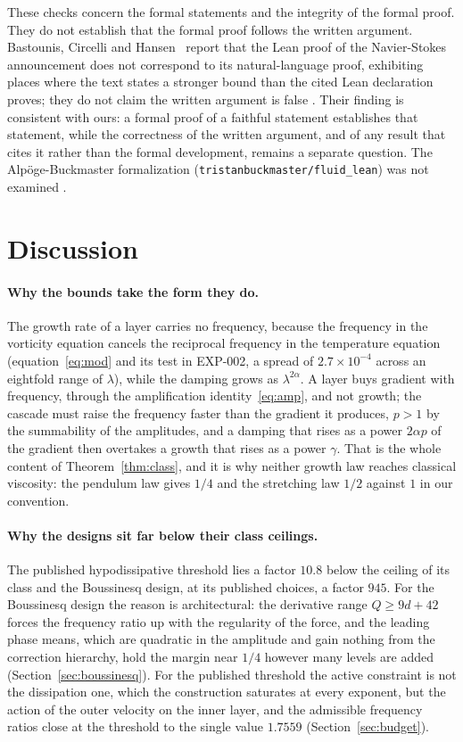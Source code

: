 \documentclass[11pt]{article}
\theoremstyle{remark}
\newcommand{\ev}[1]{\hspace{0.2em}{\small\textsf{[#1]}}}
\newcommand{\fp}[1]{\nolinkurl{#1}}
\begin{document}
These checks concern the formal statements and the integrity of the formal proof. They do not establish
that the formal proof follows the written argument. Bastounis, Circelli and Hansen~\cite{bch} report
that the Lean proof of the Navier-Stokes announcement does not correspond to its natural-language proof,
exhibiting places where the text states a stronger bound than the cited Lean declaration proves; they do
not claim the written argument is false \ev{V}. Their finding is consistent with ours: a formal proof of a
faithful statement establishes that statement, while the correctness of the written argument, and of
any result that cites it rather than the formal development, remains a separate question. The
Alp\"oge-Buckmaster formalization (\fp{tristanbuckmaster/fluid_lean}) was not examined \ev{U}.


\section{Discussion}\label{sec:discussion}

\paragraph{Why the bounds take the form they do.} The growth rate of a layer carries no frequency, because the
frequency in the vorticity equation cancels the reciprocal frequency in the temperature equation (equation~\eqref{eq:mod}
and its test in EXP-002, a spread of $2.7\times10^{-4}$ across an eightfold range of $\lambda$), while the damping grows as
$\lambda^{2\alpha}$. A layer buys gradient with frequency, through the amplification identity~\eqref{eq:amp}, and not
growth; the cascade must raise the frequency faster than the gradient it produces, $p>1$ by the summability of the
amplitudes, and a damping that rises as a power $2\alpha p$ of the gradient then overtakes a growth that rises as a power
$\gamma$. That is the whole content of Theorem~\ref{thm:class}, and it is why neither growth law reaches classical
viscosity: the pendulum law gives $1/4$ and the stretching law $1/2$ against $1$ in our convention.

\paragraph{Why the designs sit far below their class ceilings.} The published hypodissipative threshold lies a factor
$10.8$ below the ceiling of its class and the Boussinesq design, at its published choices, a factor $945$. For the
Boussinesq design the reason is architectural: the derivative range $Q\ge9d+42$ forces the frequency ratio up with the
regularity of the force, and the leading phase means, which are quadratic in the amplitude and gain nothing from the
correction hierarchy, hold the margin near $1/4$ however many levels are added (Section~\ref{sec:boussinesq}). For the
published threshold the active constraint is not the dissipation one, which the construction saturates at every
exponent, but the action of the outer velocity on the inner layer, and the admissible frequency ratios close at the
threshold to the single value $1.7559$ (Section~\ref{sec:budget}).
\end{document}
